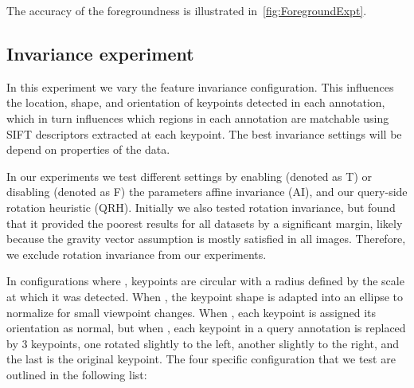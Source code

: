         The accuracy of the foregroundness is illustrated in~\cref{fig:ForegroundExpt}.
     
    \subsection{Invariance experiment}\label{sub:exptinvar} %
        In this experiment we vary the feature invariance configuration.
        This influences the location, shape, and orientation of keypoints detected in each annotation, which in
          turn influences which regions in each annotation are matchable using SIFT descriptors extracted at each
          keypoint.
        The best invariance settings will be depend on properties of the data.

        In our experiments we test different settings by enabling (denoted as T) or disabling (denoted as F) the
          parameters affine invariance (AI), and our query-side rotation heuristic (QRH).
        Initially we also tested rotation invariance, but found that it provided the poorest results for all
          datasets by a significant margin, likely because the gravity vector assumption is mostly satisfied in all
          images.
        Therefore, we exclude rotation invariance from our experiments.

        In configurations where , keypoints are circular with a radius defined by the scale at which
          it was detected.
        When , the keypoint shape is adapted into an ellipse to normalize for small viewpoint changes.
        When , each keypoint is assigned its orientation as normal, but when , each
          keypoint in a query annotation is replaced by 3 keypoints, one rotated slightly to the left, another
          slightly to the right, and the last is the original keypoint.
        The four specific configuration that we test are outlined in the following list:

